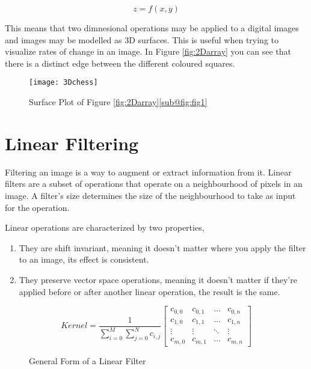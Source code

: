 \begin{equation}
    z = f(x,y)
    \label{eq:2Dfunc}
\end{equation}

This means that two dimnesional operations may be applied to a digital images and images may be modelled as 3D surfaces. This is useful when trying to visualize rates of change in an image. In Figure \ref{fig:2Darray} you can see that there is a distinct edge between the different coloured squares.

\begin{figure}[ht!]
  \centering
  \centering\texttt{[image: 3Dchess]}
  \caption{\label{fig:fig1} Surface Plot of Figure \ref{fig:2Darray}\ref{sub@fig:fig1}}
\end{figure}




\section{Linear Filtering}

Filtering an image is a way to augment or extract information from it. Linear filters are a subset of operations that operate on a neighbourhood of pixels in an image. A filter's size determines the size of the neighbourhood to take as input for the operation.

Linear operations are characterized by two properties,

\begin{enumerate}
  \item They are shift invariant, meaning it doesn't matter where you apply the filter to an image, its effect is consistent.
  \item They preserve vector space operations, meaning it doesn't matter if they're applied before or after another linear operation, the result is the same.
\end{enumerate}

\begin{figure}[H]
  
   \[ 
     Kernel  = \frac{1}{\sum\limits_{i=0}^{M}\sum\limits_{j=0}^{N}c_{i,j}}
    \begin{bmatrix}
      c_{0,0} & c_{0,1} & \dots & c_{0,n} \\
      c_{1,0} & c_{1,1} & \dots & c_{1,n} \\
      \vdots & \vdots & \ddots & \vdots \\
      c_{m,0} & c_{m,1} & \dots & c_{m,n}
    \end{bmatrix}
  \]
  \caption{General Form of a Linear Filter}
  \label{fig:generalForm}
\end{figure}


